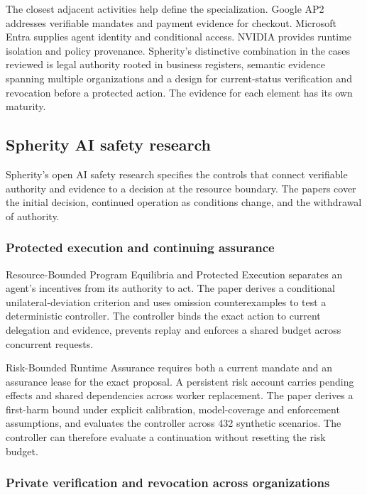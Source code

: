 The closest adjacent activities help define the specialization. Google AP2 addresses verifiable mandates and payment evidence for checkout. Microsoft Entra supplies agent identity and conditional access. NVIDIA provides runtime isolation and policy provenance. Spherity's distinctive combination in the cases reviewed is legal authority rooted in business registers, semantic evidence spanning multiple organizations and a design for current-status verification and revocation before a protected action. The evidence for each element has its own maturity.~\cite{src6,src7,src26,src27,src42,src78,src86,src89}

\subsection{Spherity AI safety research}

Spherity's open AI safety research specifies the controls that connect verifiable authority and evidence to a decision at the resource boundary. The papers cover the initial decision, continued operation as conditions change, and the withdrawal of authority.~\cite{src5,src7,src77}

\subsubsection{Protected execution and continuing assurance}

Resource-Bounded Program Equilibria and Protected Execution separates an agent's incentives from its authority to act. The paper derives a conditional unilateral-deviation criterion and uses omission counterexamples to test a deterministic controller. The controller binds the exact action to current delegation and evidence, prevents replay and enforces a shared budget across concurrent requests.~\cite{src91}

Risk-Bounded Runtime Assurance requires both a current mandate and an assurance lease for the exact proposal. A persistent risk account carries pending effects and shared dependencies across worker replacement. The paper derives a first-harm bound under explicit calibration, model-coverage and enforcement assumptions, and evaluates the controller across 432 synthetic scenarios. The controller can therefore evaluate a continuation without resetting the risk budget.~\cite{src92}

\subsubsection{Private verification and revocation across organizations}


